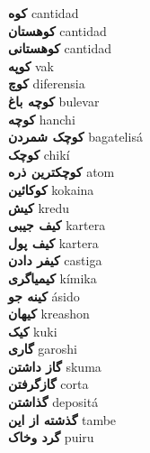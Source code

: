 \textbf{ کوه  } cantidad \\
\textbf{ کوهستان  } cantidad \\
\textbf{ کوهستانی  } cantidad \\
\textbf{ کوپه  } vak \\
\textbf{ کوچ  } diferensia \\
\textbf{ کوچه باغ  } bulevar \\
\textbf{ کوچه  } hanchi \\
\textbf{ کوچک شمردن  } bagatelisá \\
\textbf{ کوچک  } chikí \\
\textbf{ کوچکترین ذره  } atom \\
\textbf{ کوکائین  } kokaina \\
\textbf{ کیش  } kredu \\
\textbf{ کیف جیبی  } kartera \\
\textbf{ کیف پول  } kartera \\
\textbf{ کیفر دادن  } castiga \\
\textbf{ کیمیاگری  } kímika \\
\textbf{ کینه جو  } ásido \\
\textbf{ کیهان  } kreashon \\
\textbf{ کیک  } kuki \\
\textbf{ گاری  } garoshi \\
\textbf{ گاز داشتن  } skuma \\
\textbf{ گازگرفتن  } corta \\
\textbf{ گذاشتن  } depositá \\
\textbf{ گذشته از این  } tambe \\
\textbf{ گرد وخاک  } puiru \\
